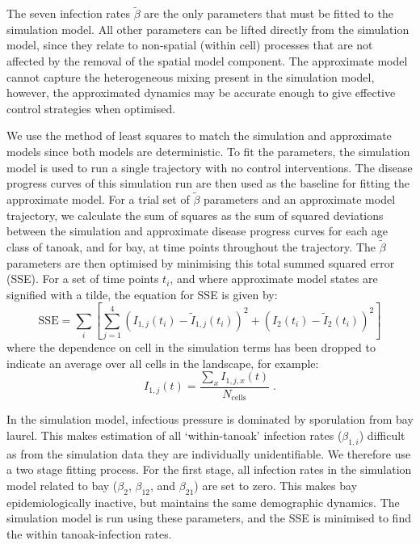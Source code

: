The seven infection rates $\tilde{\beta}$ are the only parameters that must be fitted to the simulation model. All other parameters can be lifted directly from the simulation model, since they relate to non-spatial (within cell) processes that are not affected by the removal of the spatial model component. The approximate model cannot capture the heterogeneous mixing present in the simulation model, however, the approximated dynamics may be accurate enough to give effective control strategies when optimised.

We use the method of least squares to match the simulation and approximate models since both models are deterministic. To fit the parameters, the simulation model is used to run a single trajectory with no control interventions. The disease progress curves of this simulation run are then used as the baseline for fitting the approximate model. For a trial set of $\tilde{\beta}$ parameters and an approximate model trajectory, we calculate the sum of squares as the sum of squared deviations between the simulation and approximate disease progress curves for each age class of tanoak, and for bay, at time points throughout the trajectory. The $\tilde{\beta}$ parameters are then optimised by minimising this total summed squared error (SSE). For a set of time points $t_i$, and where approximate model states are signified with a tilde, the equation for SSE is given by:
\begin{equation}
    \mathrm{SSE} = \sum_{i}\left[\sum_{j=1}^4\left(I_{1,j}(t_i) - \tilde{I}_{1,j}(t_i)\right)^2 + \left(I_{2}(t_i) - \tilde{I}_{2}(t_i)\right)^2\right]
\end{equation}
where the dependence on cell in the simulation terms has been dropped to indicate an average over all cells in the landscape, for example:
\begin{equation}
    I_{1,j}(t) = \frac{\sum_xI_{1,j,x}(t)}{N_\textrm{cells}}\;.
\end{equation}

In the simulation model, infectious pressure is dominated by sporulation from bay laurel. This makes estimation of all `within-tanoak' infection rates ($\beta_{1,i}$) difficult as from the simulation data they are individually unidentifiable. We therefore use a two stage fitting process. For the first stage, all infection rates in the simulation model related to bay ($\beta_2$, $\beta_{12}$, and $\beta_{21}$) are set to zero. This makes bay epidemiologically inactive, but maintains the same demographic dynamics. The simulation model is run using these parameters, and the SSE is minimised to find the within tanoak-infection rates.

